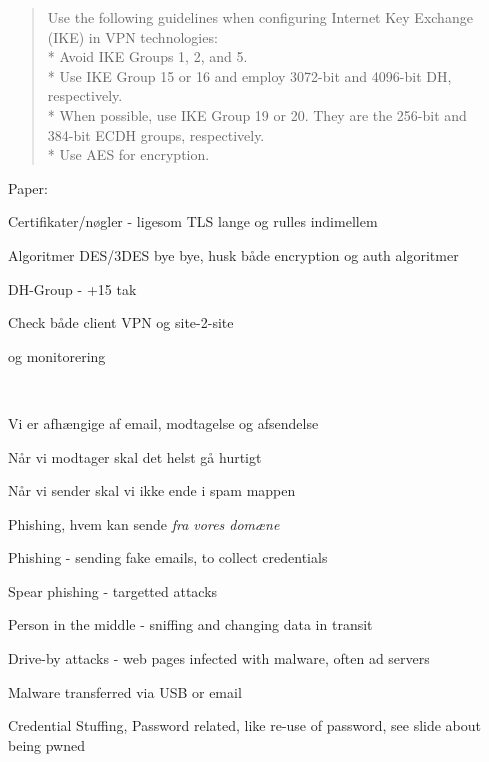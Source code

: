 \documentclass[Screen16to9,17pt]{foils}
\begin{document}

\begin{quote}
  Use the following guidelines when configuring Internet Key Exchange (IKE) in VPN technologies:\\
* Avoid IKE Groups 1, 2, and 5.\\
* Use IKE Group 15 or 16 and employ 3072-bit and 4096-bit DH, respectively.\\
* When possible, use IKE Group 19 or 20. They are the 256-bit and \\
384-bit ECDH groups, respectively.\\
* Use AES for encryption.
\end{quote}
Paper:\\
{\small {}}

\begin{list2}
\item Certifikater/nøgler - ligesom TLS lange og rulles indimellem
\item Algoritmer DES/3DES bye bye, husk både encryption og auth algoritmer
\item DH-Group - +15 tak
\item Check både client VPN og site-2-site
\end{list2}

 og monitorering

{~}

\begin{list2}
\item Vi er afhængige af email, modtagelse og afsendelse
\item Når vi modtager skal det helst gå hurtigt
\item Når vi sender skal vi ikke ende i spam mappen
\item Phishing, hvem kan sende \emph{fra vores domæne}
\end{list2}



\begin{list2}
\item Phishing - sending fake emails, to collect credentials
\item Spear phishing - targetted attacks
\item Person in the middle - sniffing and changing data in transit
\item Drive-by attacks - web pages infected with malware, often ad servers
\item Malware transferred via USB or email
\item Credential Stuffing, Password related, like re-use of password, see slide about being pwned
\end{list2}
\end{document}
